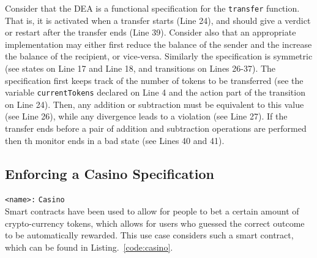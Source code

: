 \documentclass{article}
\begin{document}
            Consider that the DEA is a functional specification for the \texttt{transfer} function. That is, it is activated when a transfer starts (Line 24), and should give a verdict or restart after the transfer ends (Line 39). Consider also that an appropriate implementation may either first reduce the balance of the sender and the increase the balance of the recipient, or vice-versa. Similarly the specification is symmetric (see states on Line 17 and Line 18, and transitions on Lines 26-37). The specification first keeps track of the number of tokens to be transferred (see the variable \texttt{currentTokens} declared on Line 4 and the action part of the transition on Line 24). Then, any addition or subtraction must be equivalent to this value (see Line 26), while any divergence leads to a violation (see Line 27). If the transfer ends before a pair of addition and subtraction operations are performed then th monitor ends in a bad state (see Lines 40 and 41).
            
   \subsection{Enforcing a Casino Specification}
    \texttt{<name>:} \verb+Casino+\\
 
 Smart contracts have been used to allow for people to bet a certain amount of crypto-currency tokens, which allows for users who guessed the correct outcome to be automatically rewarded. This use case considers such a smart contract, which can be found in Listing.~\ref{code:casino}.
  
\end{document}

